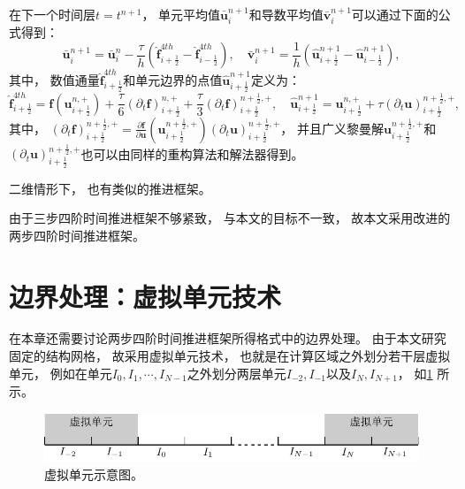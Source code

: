 在下一个时间层$t=t^{n+1}$，
单元平均值$\bar{\bm{u}}_{i}^{n+1}$和导数平均值$\bar{\bm{v}}_{i}^{n+1}$可以通过下面的公式得到：
\begin{equation}
  \bar{\bm{u}}_{i}^{n+1}=\bar{\bm{u}}_{i}^{n}-\frac{\tau}{ h} \left(\hat{\bm{f}}_{i+\frac 12}^{4th}-\hat{\bm{f}}_{i-\frac 12}^{4th}\right), \quad
  \bar{\bm{v}}_{i}^{n+1}=\frac{1}{h} \left(\hat {\bm{u}}_{i+\frac 12}^{n+1}-\hat {\bm{u}}_{i-\frac 12}^{n+1}\right),
\end{equation}
其中，
数值通量$\hat{\bm{f}}_{i+\frac 12}^{4th}$和单元边界的点值$\hat {\bm{u}}_{i+\frac 12}^{n+1}$定义为：
\begin{equation}
  \hat{\bm{f}}^{4th}_{i+\frac{1}{2}}={\bm{f}} \left({\bm{u}}_{i+\frac{1}{2}}^{n, +}\right) +\frac{\tau}{6} \left({\partial_{t}}{\bm{f}}\right)_{i+\frac{1}{2}}^{n, +}+\frac{\tau}{3} \left({\partial_{t}}{\bm{f}}\right)_{i+\frac{1}{2}}^{n+\frac12, +}, \quad
  \hat {\bm{u}}_{i+\frac{1}{2}}^{n+1}={\bm{u}}_{i+\frac{1}{2}}^{n, +}+\tau \left({\partial_{t}}{\bm{u}}\right)_{i+\frac{1}{2}}^{n+\frac{1}{2}, +},
\end{equation}
其中，
$\left({\partial_{t}}{\bm{f}}\right)_{i+\frac{1}{2}}^{n+\frac{1}{2}, +} = \frac{\partial{\bm{f}}}{\partial{\bm{u}}}\left({\bm{u}}_{i+\frac{1}{2}}^{n+\frac{1}{2}, +}\right) \left({\partial_{t}}{\bm{u}}\right)_{i+\frac{1}{2}}^{n+\frac{1}{2}, +}$，
并且广义黎曼解${\bm{u}}_{i+\frac{1}{2}}^{n+\frac{1}{2}, +}$和$\left({\partial_{t}}{\bm{u}}\right)_{i+\frac{1}{2}}^{n+\frac{1}{2}, +}$也可以由同样的重构算法和解法器得到。
\vspace{0.3\baselineskip} %

二维情形下，
也有类似的推进框架。

由于三步四阶时间推进框架不够紧致，
与本文的目标不一致，
故本文采用改进的两步四阶时间推进框架。

\section{边界处理：虚拟单元技术}

在本章还需要讨论两步四阶时间推进框架所得格式中的边界处理。
由于本文研究固定的结构网格，
故采用虚拟单元技术，
也就是在计算区域之外划分若干层虚拟单元，
例如在单元$I_0,I_1,\cdots,I_{N-1}$之外划分两层单元$I_{-2},I_{-1}$以及$I_{N},I_{N+1}$，
如\cref{fig:1D-ghostcell} 所示。
\begin{figure}[htbp]
  \centering
  \includegraphics{fig/tikz/ghostcell.pdf}
  \caption{虚拟单元示意图。
  }
  \label{fig:1D-ghostcell}
\end{figure}

